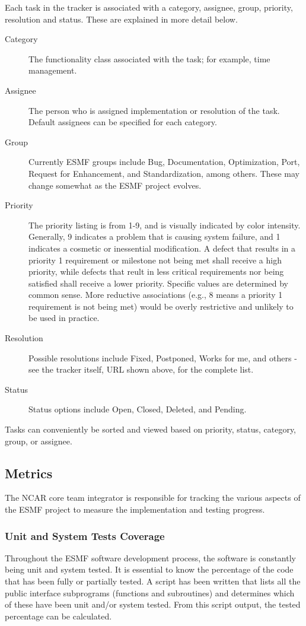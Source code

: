 Each task in the tracker is associated with a category, assignee, 
group, priority, resolution and status.  These are explained 
in more detail below. 
\begin{description}
\item[Category] The functionality class associated with the task; for
example, time management.
\item[Assignee] The person who is assigned implementation or resolution
of the task.  Default assignees can be specified for each category.
\item[Group] Currently ESMF groups include Bug, Documentation,
Optimization, Port, Request for Enhancement, and Standardization, among 
others.  These may change somewhat as the ESMF project evolves. 
\item[Priority] The priority listing is from 1-9, and is visually indicated
by color intensity.  Generally, 9 indicates a problem that is causing 
system failure, and 1 indicates a cosmetic or inessential modification.
A defect that results in a priority 1 requirement or milestone not being
met shall receive a high priority, while defects that reult in less
critical requirements nor being satisfied shall receive a lower priority.  
Specific values are determined by common sense.  More reductive
associations (e.g., 8 means a priority 1 requirement is not being met) 
would be overly restrictive and unlikely to be used in practice.  
\item[Resolution] Possible resolutions include Fixed, Postponed, 
Works for me, and others - see the tracker itself, URL shown 
above, for the complete list.
\item[Status] Status options include Open, Closed, Deleted, and Pending.
\end{description}

Tasks can conveniently be sorted and viewed based on priority, status, 
category, group, or assignee.

\subsection{Metrics}

The NCAR core team integrator is responsible for tracking the
various aspects of the ESMF project to measure the implementation and
testing progress.
\subsubsection{Unit and System Tests Coverage}
Throughout the ESMF software development process, the software is constantly
being unit and system tested. It is essential to know the percentage of the
code that has been fully or partially tested. A script has been written that 
lists all the public interface subprograms (functions and subroutines) and 
determines which of these have been unit and/or system tested. From this script
output, the tested percentage can be calculated.
